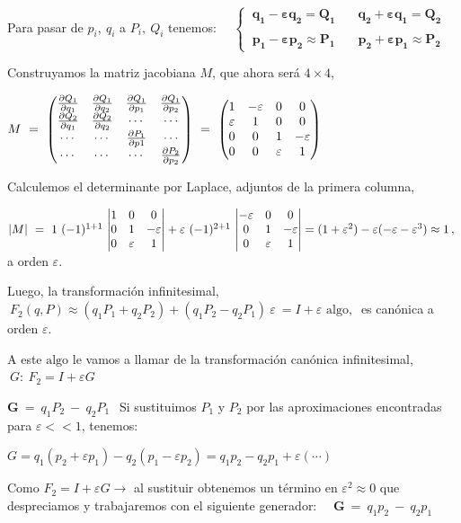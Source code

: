 Para pasar de $p_i, \ q_i$ a $P_i,\ Q_i$ tenemos:
$\quad\begin{cases} 
\ \boldsymbol{ q_1- \varepsilon q_2 =Q_1} & \quad \boldsymbol{q_2+ \varepsilon q_1=Q_2}	\\ \\
\ \boldsymbol{p_1-\varepsilon p_2 \approx P_1} & \quad \boldsymbol{p_2+\varepsilon p_1 \approx P_2}
\end{cases}$

Construyamos la matriz jacobiana $M$, que ahora será $4 \times 4$,


$M\ = \ \mqty(
\pdv{Q_1}{q_1} & \pdv{Q_1}{q_2} & \pdv{Q_1}{p_1} & \pdv{Q_1}{p_2} \\
\pdv{Q_2}{q_1} & \pdv{Q_2}{q_2} & \cdots & \cdots \\
\cdots & \cdots & \pdv{P_1}{p1} & \cdots \\
\cdots & \cdots & \cdots & \pdv{P_2}{p_2}
) \ = \ 
\mqty(
1&-\varepsilon & 0 & 0 \\ \varepsilon & 1 & 0 & 0 \\ 0 & 0 & 1 & -\varepsilon \\ 0 & 0 & \varepsilon & 1 
)$

Calculemos el determinante por Laplace, adjuntos de la primera columna,

$|M| \ = \ 
1 \ (-1)^{1+1} \ \mqty| 1&0&0 \\ 0&1&-\varepsilon \\ 0 & \varepsilon & 1  | + 
\varepsilon \ (-1)^{2+1} \ \mqty| -\varepsilon & 0 & 0 \\ 0 & 1 & - \varepsilon \\ 0 & \varepsilon & 1 |    
= (1+\varepsilon^2) - \varepsilon (-\varepsilon - \varepsilon^3 )   \approx 1     \,  , \ $ a orden $\varepsilon$.


Luego, la transformación infinitesimal, $\ F_2(q,P)\approx (q_1P_1+q_2P_2)  +  (q_1P_2-q_2P_1)\ \varepsilon\ = I + \varepsilon \text{ algo} , \ $ es canónica a orden $\varepsilon$.


A este $\text{algo}$ le vamos a llamar  de la transformación canónica infinitesimal, $\ G: \ F_2=I+\varepsilon G$ 

$\boldsymbol G\ = \ q_1P_2\ - \ q_2P_1 \ \ $
Si sustituimos $P_1$ y $P_2$ por las aproximaciones encontradas para $\varepsilon <<1$, tenemos:

$G=q_1(p_2+\varepsilon p_1)-q_2(p_1-\varepsilon p_2)=q_1p_2-q_2p_1+\varepsilon( \cdots ) \ \ $


Como $F_2=I+\varepsilon G  \to $ al sustituir obtenemos un término en $\varepsilon^2 \approx 0$ que despreciamos  y trabajaremos con el siguiente generador:
$\quad \boldsymbol G\ = \ q_1p_2\ - \ q_2p_1$

